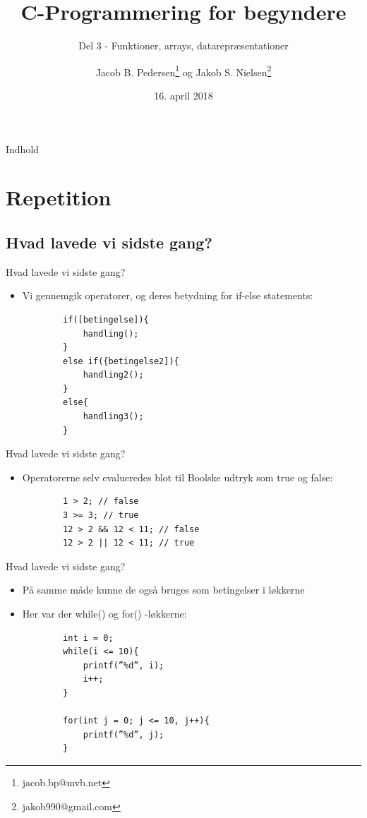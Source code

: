 \documentclass{beamer}
\title{C-Programmering for begyndere}
\date{16. april 2018}
\subtitle{Del 3 - Funktioner, arrays, datarepræsentationer}
\author{Jacob B. Pedersen\footnote{jacob.bp@mvb.net} og Jakob S. Nielsen\footnote{jakob990@gmail.com}}
\begin{document}
\begin{frame}
	\maketitle
\end{frame}

\begin{frame}{Indhold}
	\tableofcontents
\end{frame}

\section{Repetition}
\subsection{Hvad lavede vi sidste gang?}

\begin{frame}[fragile]{Hvad lavede vi sidste gang?}
	\begin{itemize}
		\item{Vi gennemgik operatorer, og deres betydning for if-else statements:}
		\begin{lstlisting}
		if([betingelse]){
			handling();
		}
		else if({betingelse2]){
			handling2();
		}
		else{
			handling3();
		}
		\end{lstlisting}
	\end{itemize}
\end{frame}


\begin{frame}[fragile]{Hvad lavede vi sidste gang?}
	\begin{itemize}
		\item{Operatorerne selv evalueredes blot til Boolske udtryk som {\color{dkgreen}true} og {\color{dkgreen}false}:}
		\begin{lstlisting}
		1 > 2; // false
		3 >= 3; // true
		12 > 2 && 12 < 11; // false
		12 > 2 || 12 < 11; // true
		\end{lstlisting}
	\end{itemize}
\end{frame}



\begin{frame}[fragile]{Hvad lavede vi sidste gang?}
	\begin{itemize}
		\item{På samme måde kunne de også bruges som betingelser i løkkerne}
		\item{Her var der {\color{C_darkblue}while}() og {\color{C_darkblue}for}() -løkkerne:}
		\begin{lstlisting}
		int i = 0;
		while(i <= 10){
			printf(”%d”, i);
			i++;
		}

		for(int j = 0; j <= 10, j++){
			printf(”%d”, j);
		}
		\end{lstlisting}
	\end{itemize}
\end{frame}
\end{document}
